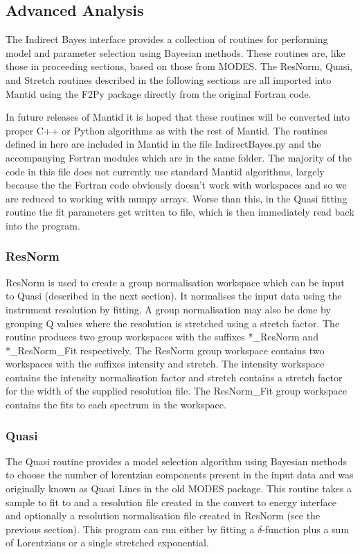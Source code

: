 \documentclass[paper=a4, fontsize=11pt]{scrartcl}	%
\numberwithin{equation}{section}															%
\numberwithin{figure}{section}																%
\numberwithin{table}{section}																%
\begin{document}
\subsection{Advanced Analysis}

The Indirect Bayes interface provides a collection of routines for performing model and parameter selection using Bayesian methods. These routines are, like those in proceeding sections, based on those from MODES. The ResNorm, Quasi, and Stretch routines described in the following sections are all imported into Mantid using the F2Py package directly from the original Fortran code. 

In future releases of Mantid it is hoped that these routines will be converted into proper C++ or Python algorithms as with the rest of Mantid. The routines defined in here are included in Mantid in the file IndirectBayes.py and the accompanying Fortran modules which are in the same folder. The majority of the code in this file does not currently use standard Mantid algorithms, largely because the the Fortran code obviously doesn't work with workspaces and so we are reduced to working with numpy arrays. Worse than this, in the Quasi fitting routine the fit parameters get written to file, which is then immediately read back into the program.

\subsubsection{ResNorm}
ResNorm is used to create a group normalisation workspace which can be input to Quasi (described in the next section). It normalises the input data using the instrument resolution by fitting. A group normalisation may also be done by grouping Q values where the resolution is stretched using a stretch factor. The routine produces two group workspaces with the suffixes \**\_ResNorm and \**\_ResNorm\_Fit respectively. The ResNorm group workspace contains two workspaces with the suffixes intensity and stretch. The intensity workspace contains the intensity normalisation factor and stretch contains a stretch factor for the width of the supplied resolution file. The ResNorm\_Fit group workspace contains the fits to each spectrum in the workspace.

\subsubsection{Quasi}
The Quasi routine provides a model selection algorithm using Bayesian methods to choose the number of lorentzian components present in the input data \cite{dssivia1992} and was originally known as Quasi Lines in the old MODES package. This routine takes a sample to fit to and a resolution file created in the convert to energy interface and optionally a resolution normalisation file created in ResNorm (see the previous section). This program can run either by fitting a $\delta$-function plus a sum of Lorentzians or a single stretched exponential.
\end{document}
